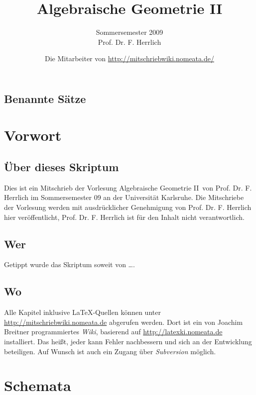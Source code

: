 \documentclass[a4paper,oneside]{scrbook}
\title{Algebraische Geometrie II}
\subtitle{Sommersemester 2009\\ Prof. Dr. F. Herrlich}
\author{Die Mitarbeiter von \url{http://mitschriebwiki.nomeata.de/}}
\theoremstyle{break}
\theoremstyle{nonumberbreak}
\theoremstyle{nonumberplain}
\theoremstyle{break}
\begin{document}
\maketitle

\setlength\parskip{0.6pt}
\tableofcontents

\section*{Benannte Sätze}


\setlength\parskip{\smallskipamount}

\chapter{Vorwort}
\setcounter{secnumdepth}{2}
\section*{Über dieses Skriptum}
Dies ist ein Mitschrieb der Vorlesung \glqq Algebraische Geometrie II\grqq\ von Prof. Dr. F. Herrlich im
Sommersemester 09 an der Universität Karlsruhe.
Die Mitschriebe der Vorlesung werden mit ausdrücklicher Genehmigung von Prof. Dr. F. Herrlich hier veröffentlicht,
Prof. Dr. F. Herrlich ist für  den Inhalt nicht verantwortlich.
\section*{Wer}
Getippt wurde das Skriptum soweit von \dots.

\section*{Wo}
Alle Kapitel inklusive \LaTeX-Quellen können unter \url{http://mitschriebwiki.nomeata.de} abgerufen werden.
Dort ist ein von Joachim Breitner programmiertes \emph{Wiki}, basierend auf \url{http://latexki.nomeata.de} installiert. 
Das heißt, jeder kann Fehler nachbessern und sich an der Entwicklung
beteiligen. Auf Wunsch ist auch ein Zugang über \emph{Subversion} möglich.

\chapter{Schemata}
\end{document}
